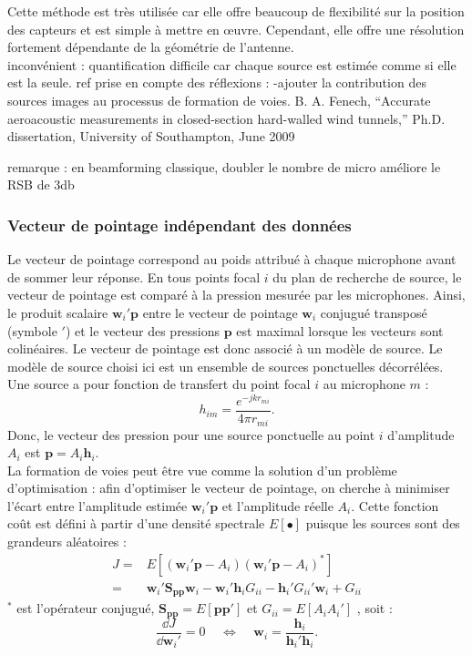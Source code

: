 Cette méthode est très utilisée  car elle offre beaucoup de flexibilité sur la position des capteurs et est simple à mettre en œuvre. Cependant, elle offre une résolution fortement dépendante de la géométrie de l'antenne.\\

inconvénient : quantification difficile car chaque source est estimée comme si elle est la seule. 
ref prise en compte des réflexions :
-ajouter la contribution des sources images au processus de formation de voies. B. A. Fenech, “Accurate aeroacoustic measurements in closed-section hard-walled wind tunnels,” Ph.D. dissertation, University of Southampton, June 2009
 
remarque : en beamforming classique, doubler le nombre de micro améliore le RSB de 3db

\subsubsection{Vecteur de pointage indépendant des données}

Le vecteur de pointage correspond au poids attribué à chaque microphone avant de sommer leur réponse.  En tous points focal $i$ du plan de recherche de source, le vecteur de pointage est comparé à la pression mesurée par les microphones. Ainsi, le produit scalaire $\bm{w}_i'\bm{p}$ entre le vecteur de pointage $\bm{w}_i$ conjugué transposé (symbole $'$) et le vecteur des pressions $\bm{p}$ est maximal lorsque les vecteurs sont colinéaires. Le vecteur de pointage est donc associé à un modèle de source. Le modèle de source choisi ici est un ensemble de sources ponctuelles décorrélées. Une source a pour fonction de transfert du point focal $i$ au microphone $m$ : 
\begin{equation}
	h_{im}=\frac{e^{-jkr_{mi}}}{4\pi r_{mi}}.
\end{equation}
Donc, le vecteur des pression pour une source ponctuelle au point $i$ d'amplitude $A_i$ est $\bm{p}=A_i\bm{h}_i$.\\

La formation de voies peut être vue comme la solution d'un problème d'optimisation : afin d'optimiser le vecteur de pointage, on cherche à minimiser l'écart entre l'amplitude estimée $\bm{w}_i'\bm{p}$ et l'amplitude réelle $A_i$. Cette fonction coût est défini à partir d'une densité spectrale $E[\bullet]$ puisque les sources sont des grandeurs aléatoires :
\begin{eqnarray}
	J=&E\left[(\bm{w}_i'\bm{p}-A_i)(\bm{w}_i'\bm{p}-A_i)^*\right]\\
	 =& \bm{w}_i'\bm{S_{pp}}\bm{w}_i-\bm{w}_i'\bm{h}_iG_{ii}-\bm{h}_i'G_{ii}'\bm{w}_i + G_{ii}
\end{eqnarray}
$^*$ est l'opérateur conjugué, $\bm{S_{pp}}=E[\bm{p}\bm{p}']$ et $G_{ii}=E[A_iA_i']$ , soit : 
\begin{equation}
	\frac{\dd J}{\dd \bm{w}_i'}=0 ~~~~~\Leftrightarrow ~~~~~ \bm{w}_i=\frac{\bm{h}_i}{\bm{h}_i'\bm{h}_i}.
\end{equation}

